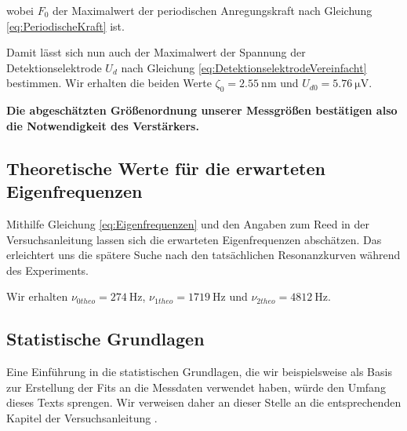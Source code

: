 wobei $F_0$ der Maximalwert der periodischen Anregungskraft nach Gleichung \ref{eq:PeriodischeKraft} ist.

Damit lässt sich nun auch der Maximalwert der Spannung der Detektionselektrode $U_d$ nach Gleichung \ref{eq:DetektionselektrodeVereinfacht} bestimmen.
Wir erhalten die beiden Werte $\zeta_0 = \SI{2.55}{\nano\meter}$ und $U_{d0} = \SI{5.76}{\micro\volt}$.

\textbf{Die abgeschätzten Größenordnung unserer Messgrößen bestätigen also die Notwendigkeit des Verstärkers.}

\subsection{Theoretische Werte für die erwarteten Eigenfrequenzen}

Mithilfe Gleichung \ref{eq:Eigenfrequenzen} und den Angaben zum Reed in der Versuchsanleitung \cite{Anleitung} lassen sich die erwarteten Eigenfrequenzen abschätzen.
Das erleichtert uns die spätere Suche nach den tatsächlichen Resonanzkurven während des Experiments.

Wir erhalten $\nu_{0 theo} = \SI{274}{\hertz}$, $\nu_{1 theo} = \SI{1719}{\hertz}$ und $\nu_{2 theo} = \SI{4812}{\hertz}$.
\label{eq:AbschaetzungEigenfrequenzen}

\subsection{Statistische Grundlagen}

Eine Einführung in die statistischen Grundlagen, die wir beispielsweise als Basis zur Erstellung der Fits an die Messdaten verwendet haben, würde den Umfang dieses Texts sprengen.
Wir verweisen daher an dieser Stelle an die entsprechenden Kapitel der Versuchsanleitung \cite{Anleitung}.
